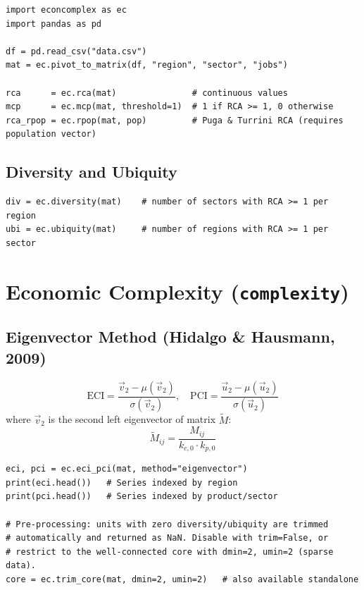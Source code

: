 \documentclass[12pt, a4paper]{article}
\begin{document}
\begin{lstlisting}[caption={Continuous and binary RCA}]
import econcomplex as ec
import pandas as pd

df = pd.read_csv("data.csv")
mat = ec.pivot_to_matrix(df, "region", "sector", "jobs")

rca      = ec.rca(mat)               # continuous values
mcp      = ec.mcp(mat, threshold=1)  # 1 if RCA >= 1, 0 otherwise
rca_rpop = ec.rpop(mat, pop)         # Puga & Turrini RCA (requires population vector)
\end{lstlisting}

\subsection{Diversity and Ubiquity}

\begin{lstlisting}[caption={Diversity and ubiquity}]
div = ec.diversity(mat)    # number of sectors with RCA >= 1 per region
ubi = ec.ubiquity(mat)     # number of regions with RCA >= 1 per sector
\end{lstlisting}

\section{Economic Complexity (\texttt{complexity})}

\subsection{Eigenvector Method (Hidalgo \& Hausmann, 2009)}

\[
  \text{ECI} = \frac{\vec{v}_2 - \mu(\vec{v}_2)}{\sigma(\vec{v}_2)}, \quad
  \text{PCI} = \frac{\vec{u}_2 - \mu(\vec{u}_2)}{\sigma(\vec{u}_2)}
\]
where $\vec{v}_2$ is the second left eigenvector of matrix $\tilde{M}$:
\[
  \tilde{M}_{ij} = \frac{M_{ij}}{k_{c,0} \cdot k_{p,0}}
\]

\begin{lstlisting}[caption={ECI and PCI using the eigenvector method}]
eci, pci = ec.eci_pci(mat, method="eigenvector")
print(eci.head())   # Series indexed by region
print(pci.head())   # Series indexed by product/sector

# Pre-processing: units with zero diversity/ubiquity are trimmed
# automatically and returned as NaN. Disable with trim=False, or
# restrict to the well-connected core with dmin=2, umin=2 (sparse data).
core = ec.trim_core(mat, dmin=2, umin=2)   # also available standalone
\end{lstlisting}
\end{document}
